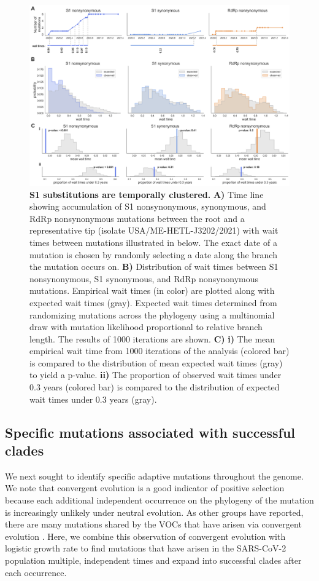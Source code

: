 \documentclass[12pt, letterpaper]{article}
\begin{document}
\begin{figure}[h!]
	\centerline{\includegraphics[scale=0.5]{fig3.png}}
	\caption{\textbf{S1 substitutions are temporally clustered.}
	\textbf{A)} Time line showing accumulation of S1 nonsynonymous, synonymous, and RdRp nonsynonymous mutations between the root and a representative tip (isolate USA/ME-HETL-J3202/2021) with wait times between mutations illustrated in below. The exact date of a mutation is chosen by randomly selecting a date along the branch the mutation occurs on. \textbf{B)} Distribution of wait times between S1 nonsynonymous, S1 synonymous, and RdRp nonsynonymous mutations. Empirical wait times (in color) are plotted along with expected wait times (gray). Expected wait times determined from randomizing mutations across the phylogeny using a multinomial draw with mutation likelihood proportional to relative branch length. The results of 1000 iterations are shown. \textbf{C)} \textbf{i)} The mean empirical wait time from 1000 iterations of the analysis (colored bar) is compared to the distribution of mean expected wait times (gray) to yield a p-value. \textbf{ii)} The proportion of observed wait times under 0.3 years (colored bar) is compared to the distribution of expected wait times under 0.3 years (gray).
	}
	\label{fig:fig3}
\end{figure}

\subsection*{Specific mutations associated with successful clades}
We next sought to identify specific adaptive mutations throughout the genome. We note that convergent evolution is a good indicator of positive selection because each additional independent occurrence on the phylogeny of the mutation is increasingly unlikely under neutral evolution. As other groups have reported, there are many mutations shared by the VOCs that have arisen via convergent evolution \citep{Van_Dorp2020-ox, Rochman2021-sv, Martin2021-lj}. Here, we combine this observation of convergent evolution with logistic growth rate to find mutations that have arisen in the SARS-CoV-2 population multiple, independent times and expand into successful clades after each occurrence.
\end{document}
